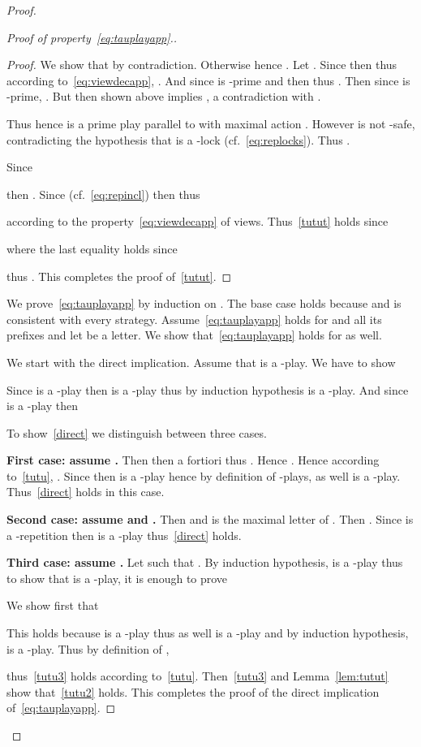 \documentclass[a4paper,UKenglish]{lipics-v2016}
\begin{document}
\begin{proof}
\begin{proof}[Proof of property~\eqref{eq:tauplayapp}.]
\begin{proof}
We show that  by contradiction.
Otherwise  hence
.
Let .
Since  then  thus
according to~\eqref{eq:viewdecapp},
.
And since  is -prime and 
then  thus .
Then since  is -prime,
.
But then  shown above implies 
, a contradiction with .

Thus  hence 
 is a prime play parallel to 
with maximal action .
However  is not -safe,
contradicting the hypothesis that  is a -lock (cf.~\eqref{eq:replocks}).
Thus .

Since

then .
Since  (cf.~\eqref{eq:repincl})
then  thus

according to the property~\eqref{eq:viewdecapp}
of views.
Thus~\eqref{tutut} holds since

where the last equality holds since

thus .
This completes the proof of~\eqref{tutut}.
\end{proof}

\medskip

We prove~\eqref{eq:tauplayapp}
by induction on .
The base case  holds because 
and  is consistent with every strategy.
Assume~\eqref{eq:tauplayapp} holds for  and all its prefixes and let
 be a letter. We show that~\eqref{eq:tauplayapp} holds for  as well.

\medskip

We start with the direct implication.
Assume that  is a -play.
We have to show


Since  is a -play then  is a -play thus by induction hypothesis
 is a -play.
And since  is a -play then


To show~\eqref{direct} we distinguish between three cases.

{\bf First case: assume .} Then 
then a fortiori 
thus .
Hence .
Hence according to~\eqref{tutu},
.
Since  then  is a -play hence by definition
of -plays,  as well is a -play.
Thus~\eqref{direct} holds in this case.

{\bf Second case: assume  and .} Then  and  is the maximal letter of . Then . Since  is a -repetition then  is a -play thus~\eqref{direct} holds.

{\bf Third case: assume .} Let  such that .
By induction hypothesis,  is a -play thus to show that
 is a -play, it is enough to prove

We show first that

This holds because  is a -play thus  as well
is a -play
and by induction hypothesis,  is a -play.
Thus by definition of ,

thus~\eqref{tutu3} holds according to~\eqref{tutu}.
Then~\eqref{tutu3} and Lemma~\ref{lem:tutut} show that~\eqref{tutu2} holds.  
This completes the proof of the direct implication of~\eqref{eq:tauplayapp}.


\end{proof}
\end{proof}
\end{document}
